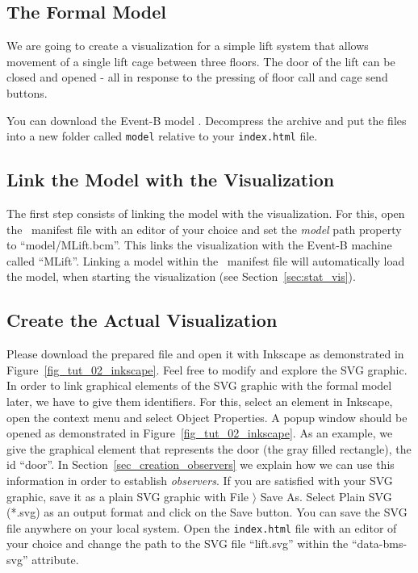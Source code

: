 \subsection{The Formal Model}

We are going to create a visualization	for a simple lift system that allows movement of a single lift cage between three floors.
The door of the lift can be closed and opened - all in response to the pressing of floor call and cage send buttons.

You can download the Event-B model .
Decompress the archive and put the files into a new folder called \texttt{model} relative to your \texttt{index.html} file.

\subsection{Link the Model with the Visualization}

The first step consists of linking the model with the visualization.
For this, open the \bms\ manifest file with an editor of your choice and set the \textit{model} path property to ``model/MLift.bcm''.
This links the visualization with the Event-B machine called ``MLift''.
Linking a model within the \bms\ manifest file will automatically load the model, when starting the visualization (see Section~\ref{sec:stat_vis}).

\subsection{Create the Actual Visualization}

Please download the prepared  file and open it with Inkscape as demonstrated in Figure~\ref{fig_tut_02_inkscape}.
Feel free to modify and explore the SVG graphic.
In order to link graphical elements of the SVG graphic with the formal model later, we have to give them identifiers. 
For this, select an element in Inkscape, open the context menu and select \textsf{Object Properties}.
A popup window should be opened as demonstrated in Figure~\ref{fig_tut_02_inkscape}.
As an example, we give the graphical element that represents the door (the gray filled rectangle), the id ``door''.
In Section~\ref{sec_creation_observers} we explain how we can use this information in order to establish \textit{observers}.
If you are satisfied with your SVG graphic, save it as a plain SVG graphic with \textsf{File $\rangle$ Save As}.
Select \textsf{Plain SVG (*.svg)} as an output format and click on the \textsf{Save} button.
You can save the SVG file anywhere on your local system. 
Open the \texttt{index.html} file with an editor of your choice and change the path to the SVG file ``lift.svg'' within the ``data-bms-svg'' attribute.

